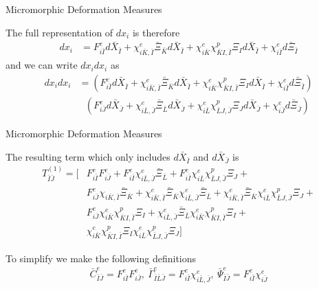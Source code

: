 \documentclass[11pt]{beamer}
\begin{document}
\begin{frame}{Micromorphic Deformation Measures}

The full representation of $dx_i$ is therefore
\begin{align*}
dx_i &= F_{i\bar{I}}^e d\bar{X}_{\bar{I}} + \chi_{i\bar{K},\bar{I}}^e\bar{\Xi}_{\bar{K}}d\bar{X}_{\bar{I}} + \chi_{i\bar{K}}^e\chi_{\bar{K}I,\bar{I}}^p \Xi_I d\bar{X}_{\bar{I}} + \chi_{i\bar{I}}^e d\bar{\Xi}_{\bar{I}}
\end{align*}
and we can write $dx_i dx_i$ as
\begin{align*}
dx_i dx_i &= \left(F_{i\bar{I}}^e d\bar{X}_{\bar{I}} + \chi_{i\bar{K},\bar{I}}^e\bar{\Xi}_{\bar{K}}d\bar{X}_{\bar{I}} + \chi_{i\bar{K}}^e\chi_{\bar{K}I,\bar{I}}^p \Xi_I d\bar{X}_{\bar{I}} + \chi_{i\bar{I}}^e d\bar{\Xi}_{\bar{I}}\right)\\
&\ \ \ \left(F_{i\bar{J}}^e d\bar{X}_{\bar{J}} + \chi_{i\bar{L},\bar{J}}^e\bar{\Xi}_{\bar{L}}d\bar{X}_{\bar{J}} + \chi_{i\bar{L}}^e\chi_{\bar{L}J,\bar{J}}^p \Xi_J d\bar{X}_{\bar{J}} + \chi_{i\bar{J}}^e d\bar{\Xi}_{\bar{J}}\right)
\end{align*}

\end{frame}

\begin{frame}{Micromorphic Deformation Measures}

The resulting term which only includes $d\bar{X}_{\bar{I}}$ and $d\bar{X}_{\bar{J}}$ is 
\begin{align*}
T_{\bar{I}\bar{J}}^{(1)} = \bigg[& F_{i\bar{I}}^eF_{i\bar{J}}^e + F_{i\bar{I}}^e \chi_{i\bar{L},\bar{J}}^e \bar{\Xi}_{\bar{L}} + F_{i\bar{I}}^e \chi_{i\bar{L}}^e\chi_{\bar{L}J,\bar{J}}^p \Xi_{J} +\\
&F_{i\bar{J}}^e \chi_{i\bar{K},\bar{I}}\bar{\Xi}_{\bar{K}} + \chi_{i\bar{K},\bar{I}}^e \bar{\Xi}_{\bar{K}}\chi_{i\bar{L},\bar{J}}^e\bar{\Xi}_{\bar{L}} +  \chi_{i\bar{K},\bar{I}}^e\bar{\Xi}_{\bar{K}} \chi_{i\bar{L}}^e \chi_{\bar{L}J, \bar{J}}^p \Xi_{J}+\\
&F_{i\bar{J}}^e\chi_{i\bar{K}}^e\chi_{\bar{K}I,\bar{I}}^p \Xi_I + \chi_{i\bar{L},\bar{J}}^e \bar{\Xi}_{\bar{L}}\chi_{i\bar{K}}^e\chi_{\bar{K}I,\bar{I}}^p \Xi_I +\\
& \chi_{i\bar{K}}^e\chi_{\bar{K}I,\bar{I}}^p \Xi_I \chi_{i\bar{L}}^e \chi_{\bar{L}J,\bar{J}}^p \Xi_J \bigg] %
\end{align*}

To simplify we make the following definitions
\begin{align*}
\bar{C}_{\bar{I}\bar{J}}^e = F_{i\bar{I}}^e F_{i\bar{J}}^e,\ \bar{\Gamma}_{\bar{I}\bar{L}\bar{J}}^e = F_{i\bar{I}}^e \chi_{i\bar{L},\bar{J}}^e,\ \bar{\Psi}_{\bar{I}\bar{J}}^e = F_{i\bar{I}}^e \chi_{i\bar{J}}^e\\
\end{align*}

\end{frame}
\end{document}
